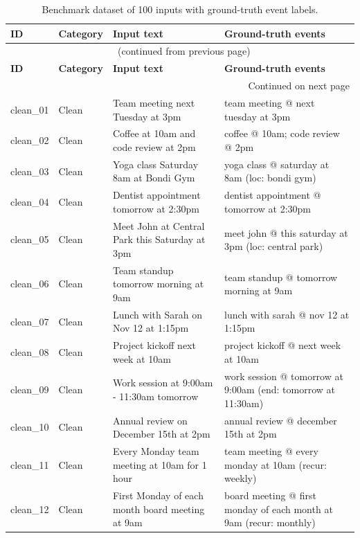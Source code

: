 \begin{longtable}{@{}p{2.2cm}p{2.1cm}p{5cm}p{5cm}@{}}
\caption{Benchmark dataset of 100 inputs with ground-truth event labels.}
\label{tab:appendix-dataset}\\
\toprule
\textbf{ID} & \textbf{Category} & \textbf{Input text} & \textbf{Ground-truth events} \\
\midrule
\endfirsthead
\multicolumn{4}{c}{{\tablename\ \thetable{} (continued from previous page)}}\\
\toprule
\textbf{ID} & \textbf{Category} & \textbf{Input text} & \textbf{Ground-truth events} \\
\midrule
\endhead
\midrule
\multicolumn{4}{r}{{Continued on next page}}\\
\endfoot
\bottomrule
\endlastfoot
clean\_01 & Clean & Team meeting next Tuesday at 3pm & team meeting @ next tuesday at 3pm \\
clean\_02 & Clean & Coffee at 10am and code review at 2pm & coffee @ 10am; code review @ 2pm \\
clean\_03 & Clean & Yoga class Saturday 8am at Bondi Gym & yoga class @ saturday at 8am (loc: bondi gym) \\
clean\_04 & Clean & Dentist appointment tomorrow at 2:30pm & dentist appointment @ tomorrow at 2:30pm \\
clean\_05 & Clean & Meet John at Central Park this Saturday at 3pm & meet john @ this saturday at 3pm (loc: central park) \\
clean\_06 & Clean & Team standup tomorrow morning at 9am & team standup @ tomorrow morning at 9am \\
clean\_07 & Clean & Lunch with Sarah on Nov 12 at 1:15pm & lunch with sarah @ nov 12 at 1:15pm \\
clean\_08 & Clean & Project kickoff next week at 10am & project kickoff @ next week at 10am \\
clean\_09 & Clean & Work session at 9:00am - 11:30am tomorrow & work session @ tomorrow at 9:00am (end: tomorrow at 11:30am) \\
clean\_10 & Clean & Annual review on December 15th at 2pm & annual review @ december 15th at 2pm \\
clean\_11 & Clean & Every Monday team meeting at 10am for 1 hour & team meeting @ every monday at 10am (recur: weekly) \\
clean\_12 & Clean & First Monday of each month board meeting at 9am & board meeting @ first monday of each month at 9am (recur: monthly) \\

\end{longtable}
